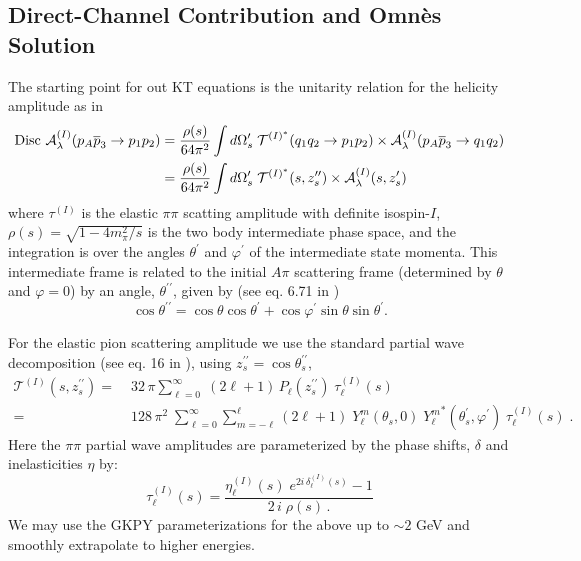 \subsection{Direct-Channel Contribution and Omn\`{e}s Solution}
The starting point for out KT equations is the unitarity relation for the helicity amplitude as in \cite{Danilkin:2014cra}
  \begin{align}
    \label{eq:unitarity}
    \text{Disc } \mathcal{A}^{(I)}_\lambda(p_A \overline{p}_3 \to p_1 p_2 ) =&\; \frac{\rho(s)}{64 \pi^2} \int d\Omega_s^\prime  \; {\mathcal{T}}^{(I)^*}(q_1q_2 \to p_1p_2) \times \mathcal{A}^{(I)}_\lambda(p_A \overline{p}_{3} \to q_1 q_2 ) \nonumber \\
    =& \; \frac{\rho(s)}{64 \pi^2} \int d\Omega_s^\prime  \; {\mathcal{T}}^{(I)^*}(s,z_s^{\prime\prime}) \times \mathcal{A}^{(I)}_\lambda(s,z_s^{\prime})
  \end{align}
where \({\tau^{(I)}}\) is the elastic \(\pi\pi\) scatting amplitude with definite isospin-\(I\), \(\rho(s) = \sqrt{1 - 4m_\pi^2/s}\) is the two body intermediate phase space, and the integration is over the angles \(\theta^\prime\) and \(\varphi^\prime\) of the intermediate state momenta. This intermediate frame is related to the initial \(A\pi\) scattering frame (determined by \(\theta\) and \(\varphi = 0\)) by an angle, \(\theta^{\prime\prime}\), given by (see eq. 6.71 in \cite{MS})
  \begin{equation}
    \cos \theta^{\prime\prime} = \cos \theta \cos \theta^\prime + \cos \varphi^\prime \sin\theta \sin \theta^\prime.
  \end{equation}

For the elastic pion scattering amplitude we use the standard partial wave decomposition (see eq. 16 in \cite{Danilkin:2014cra}), using \( z_s^{\prime\prime} = \cos \theta_s^{\prime\prime}\),
  \begin{align}
    \label{eq:elastic-pion}
    \mathcal{T}^{(I)}(s, z_s^{\prime\prime}) =& \; 32 \, \pi \sum_{\ell=0  }^\infty \; (2\ell+1) \, P_{\ell}(z_s^{\prime\prime}) \; \tau_\ell^{(I)}(s) \nonumber \\
    =& \; 128 \, \pi^2 \;
    \sum_{\ell=0}^\infty \sum_{m=-\ell}^{\ell}
    (2\ell +1 ) \; Y^m_\ell(\theta_s,0) \; {Y^m_\ell}^*(\theta_s^\prime, \varphi^\prime)
      \; \tau_\ell^{(I)}(s) \; .
  \end{align}
Here the \(\pi\pi\) partial wave amplitudes are parameterized by the phase shifts, \(\delta\) and inelasticities \(\eta\) by:
  \begin{equation}
    \tau^{(I)}_\ell(s) =
    \frac{
    \eta_\ell^{(I)}(s) \; e^{2 i \, \delta_\ell^{(I)}(s)} - 1
    }{
    2 \, i \; \rho(s) \, .
    }
  \end{equation}
We may use the GKPY parameterizations \cite{Garcia-Martin2011} for the above up to \(\sim 2\) GeV and smoothly extrapolate to higher energies.


